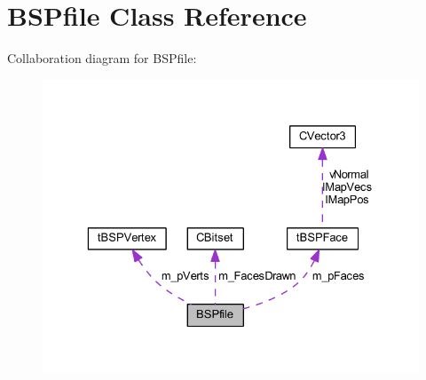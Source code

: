\hypertarget{class_b_s_pfile}{}\section{B\+S\+Pfile Class Reference}
\label{class_b_s_pfile}


Collaboration diagram for B\+S\+Pfile\+:
\nopagebreak
\begin{figure}[H]
\begin{center}
\leavevmode
\includegraphics[width=329pt]{class_b_s_pfile__coll__graph}
\end{center}
\end{figure}
